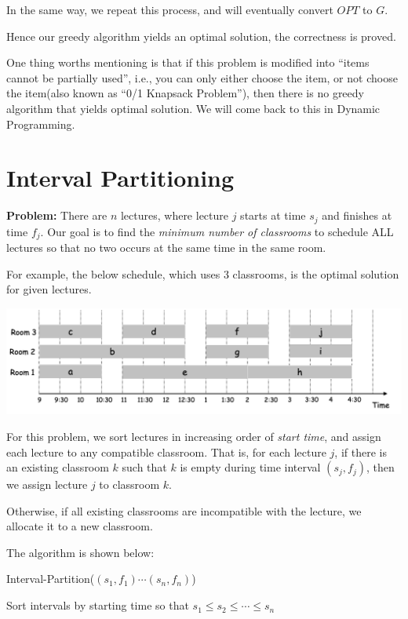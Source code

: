 \begin{spacing}{1.3}
    In the same way, we repeat this process, and will eventually convert $OPT$ to $G$.

    Hence our greedy algorithm yields an optimal solution, the correctness is proved.

    \vspace{0.3in}
    One thing worths mentioning is that if this problem is modified into ``items 
    cannot be partially used'', i.e., you can only either choose the item, or 
    not choose the item(also known as ``0/1 Knapsack Problem''), then there is no 
    greedy algorithm that yields optimal solution. We will come back to this in 
    Dynamic Programming.


    \section{Interval Partitioning}

    {\bf Problem:} There are $n$ lectures, where lecture $j$ starts at 
    time $s_j$ and finishes at time $f_j$. Our goal is to find the {\it minimum 
    number of classrooms} to schedule ALL lectures so that no two occurs at the 
    same time in the same room.

    For example, the below schedule, which uses 3 classrooms, is the optimal 
    solution for given lectures.
    \begin{center}
        \includegraphics[scale=0.5]{images/07-interval-part-demo.png}
    \end{center}

    For this problem, we sort lectures in increasing order of {\it start time}, 
    and assign each lecture to any compatible classroom. That is, 
    for each lecture $j$, if there is an existing classroom $k$ such that 
    $k$ is empty during time interval $(s_j, f_j)$, then we assign lecture $j$
    to classroom $k$.

    Otherwise, if all existing classrooms are incompatible with the lecture, 
    we allocate it to a new classroom.

    The algorithm is shown below:

    \begin{algorithm*}[htbp]
        \caption{Interval-Partition($(s_1,f_1)\cdots (s_n, f_n)$)}
        Sort intervals by starting time so that $s_1\le s_2\le \cdots \le s_n$


\end{algorithm*}
\end{spacing}
